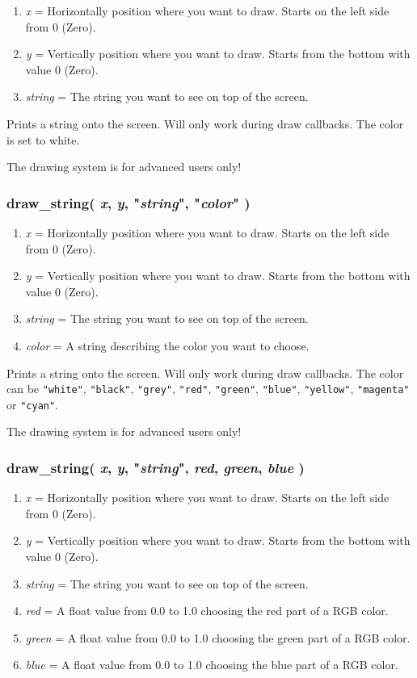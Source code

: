 \documentclass[11pt,parskip=half,a4paper]{scrartcl}
\begin{document}
\begin{enumerate}
	\item \emph{x} = Horizontally position where you want to draw. Starts on the left side from 0 (Zero).
	\item \emph{y} = Vertically position where you want to draw. Starts from the bottom with value 0 (Zero).
	\item \emph{string} = The string you want to see on top of the screen.
\end{enumerate}

Prints a string onto the screen. Will only work during draw callbacks. The color is set to white.

The drawing system is for advanced users only!

\subsubsection{draw\_string( \emph{x}, \emph{y}, "\emph{string}",  "\emph{color}" )}

\begin{enumerate}
	\item \emph{x} = Horizontally position where you want to draw. Starts on the left side from 0 (Zero).
	\item \emph{y} = Vertically position where you want to draw. Starts from the bottom with value 0 (Zero).
	\item \emph{string} = The string you want to see on top of the screen.
	\item \emph{color} = A string describing the color you want to choose.
\end{enumerate}

Prints a string onto the screen. Will only work during draw callbacks. The color can be \verb|"white"|, \verb|"black"|, \verb|"grey"|, \verb|"red"|, \verb|"green"|, \verb|"blue"|, \verb|"yellow"|, \verb|"magenta"| or \verb|"cyan"|.

The drawing system is for advanced users only!

\subsubsection{draw\_string( \emph{x}, \emph{y}, "\emph{string}",  \emph{red}, \emph{green}, \emph{blue} )}

\begin{enumerate}
	\item \emph{x} = Horizontally position where you want to draw. Starts on the left side from 0 (Zero).
	\item \emph{y} = Vertically position where you want to draw. Starts from the bottom with value 0 (Zero).
	\item \emph{string} = The string you want to see on top of the screen.
	\item \emph{red} = A float value from 0.0 to 1.0 choosing the red part of a RGB color.
	\item \emph{green} = A float value from 0.0 to 1.0 choosing the green part of a RGB color.
	\item \emph{blue} = A float value from 0.0 to 1.0 choosing the blue part of a RGB color.
\end{enumerate}
\end{document}
